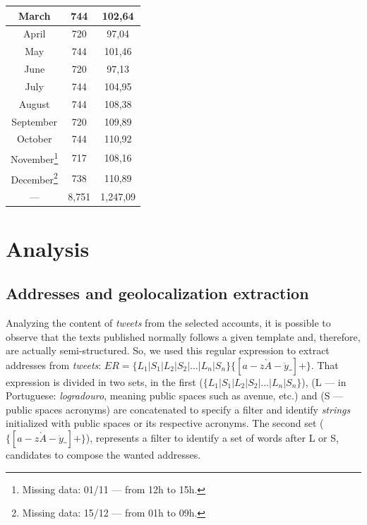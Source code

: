 \documentclass[runningheads]{llncs}
\begin{document}
\begin{table}[!htb]
\begin{minipage}{.45\linewidth}
\begin{tabular}{ c | c | c}
\hline
 March & 744 & 102,64 \\
\hline
 April & 720 & 97,04 \\
\hline
 May & 744 & 101,46 \\
\hline
 June & 720 & 97,13 \\
\hline
 July & 744 & 104,95 \\
\hline
 August &  744 & 108,38 \\
\hline
 September & 720 & 109,89 \\
\hline
 October & 744 & 110,92 \\
\hline
 November\footnote{Missing data: 01/11 --- from 12h to 15h.} & 717 & 108,16 \\
\hline
 December\footnote{Missing data: 15/12 --- from 01h to 09h.} & 738 & 110,89 \\
\midrule
{---} & 8,751 & 1,247,09 \\
\bottomrule
\end{tabular}
    \end{minipage} 
\end{table}

\section{Analysis}
\subsection{Addresses and geolocalization extraction}

Analyzing the content of \textit{tweets} from the selected accounts, it is possible to observe that the texts published normally follows a given template and, therefore, are actually semi-structured. So, we used this regular expression to extract addresses from \textit{tweets}: $ER = \lbrace L_1 | S_1 | L_2 | S_2 | \dots | L_n | S_n \rbrace \lbrace [a-z\grave{A}-\ddot{y}\_] + \rbrace$.
That expression is divided in two sets, in the first ($\lbrace L_1 | S_1 | L_2 | S_2 | \dots | L_n | S_n \rbrace $), (L --- in Portuguese: \textit{logradouro}, meaning public spaces such as avenue, etc.) and (S --- public spaces acronyms) are concatenated to specify a filter and identify \textit{strings} initialized with public spaces or its respective acronyms. The second set ($\lbrace [a-z\grave{A}-\ddot{y}\_] + \rbrace $), represents a filter to identify a set of words after L or S, candidates to compose the wanted addresses.
\end{document}
